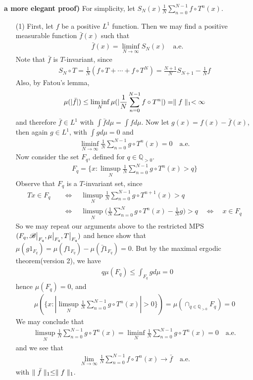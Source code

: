 \documentclass[10pt,a4paper]{report}
\newenvironment{proof}
{\begin{changemargin}{1cm}{0.5cm} 
	}%
	{\end{changemargin}
}
\begin{document}
\begin{proof}
\textbf{a more elegant proof) }
For simplicity, let $S_N(x) \frac{1}{N} \sum_{n=0}^{N-1} f\circ T^n (x)$.
\begin{itemize}
\item[(1)] First, let $f$ be a positive $L^1$ function. Then we may find a positive measurable function $\bar{f}(x)$  such that
\begin{align*}
&\bar{f}(x) = \liminf_{N\rightarrow \infty} S_N(x) \quad \text{a.e.}
\end{align*}
Note that $\bar{f}$ is $T$-invariant, since
\begin{align*}
S_N \circ T = \frac{1}{N}(f\circ T + \cdots + f\circ T^N) = \frac{N+1}{N} S_{N+1} - \frac{1}{N} f
\end{align*} 
Also, by Fatou's lemma,
\begin{align*}
\mu (| \bar{f} |) \leq \liminf_{N} \mu(| \frac{1}{N} \sum_{n=0}^{N-1} f\circ T^n |) = \parallel f \parallel_{1} <\infty  
\end{align*}
and therefore $\bar{f} \in L^1$ with $\int \bar{f} d\mu = \int fd\mu$. Now let $g(x) = f(x) - \bar{f}(x)$, then again $g\in L^1$, with $\int g d\mu = 0$ and 
\begin{align*}
\liminf_{N\rightarrow \infty} \frac{1}{N} \sum_{n=0}^{N-1} g\circ T^n (x) =0 \quad \text{a.e.}
\end{align*}
Now consider the set $F_q$, defined for $q\in \mathbb{Q}_{>0}$.
\begin{align*}
F_q = \{  x: \limsup_N  \frac{1}{N} \sum_{n=0}^{N-1} g \circ T^n (x) > q   \}
\end{align*}
Observe that $F_q$ is a $T$-invariant set, since
\begin{align*}
Tx \in F_q \quad &\Leftrightarrow \quad \limsup_{N} \frac{1}{N} \sum_{n=0}^{N-1} g\circ T^{n+1}(x) > q \\
&\Leftrightarrow \quad \limsup_{N} \Big( \frac{1}{N} \sum_{n=0}^{N} g\circ T^{n}(x) -\frac{1}{N} g \Big) > q \quad \Leftrightarrow \quad x\in F_q
\end{align*}
So we may repeat our arguments above to the restricted MPS $(F_q, \mathscr{B} \big|_{F_q}, \mu\big|_{F_q}, T\big|_{F_q})$ and hence show that $\mu(g 1_{F_q}) = \mu(f 1_{F_q}) - \mu(\bar{f} 1_{F_q}) =0$. But by the maximal ergodic theorem(version 2), we have
\begin{align*}
& q \mu(F_q) \leq  \int_{F_q} g d\mu =0
\end{align*}
hence $\mu(F_q) =0$, and 
\begin{align*}
\mu(\{ x : |\limsup_N  \frac{1}{N} \sum_{n=0}^{N-1} g \circ T^n (x) |>0  \}) = \mu (\cap_{q\in \mathbb{Q}_{>0}} F_q) = 0
\end{align*}
We may conclude that
\begin{align*}
\limsup_N  \frac{1}{N} \sum_{n=0}^{N-1} g \circ T^n (x) = \liminf_N  \frac{1}{N} \sum_{n=0}^{N-1} g \circ T^n (x)  = 0 \quad \text{a.e.}
\end{align*}
and we see that
\begin{align*}
\lim_{N\rightarrow \infty }\frac{1}{N} \sum_{n=0}^{N-1} f \circ T^n (x) \rightarrow \bar{f} \quad \text{a.e.}
\end{align*}
with $\parallel \bar{f} \parallel_{1} \leq \parallel f \parallel_{1}$.


\end{itemize}
\end{proof}
\end{document}
